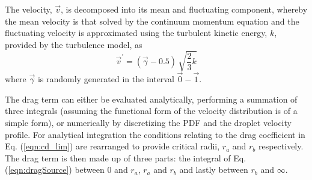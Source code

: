 \documentclass[a4paper,10pt]{article}
\begin{document}
The velocity, $\vec{v}$, is decomposed into its mean and fluctuating component, whereby the mean velocity is that solved by the continuum momentum equation and the fluctuating velocity is approximated using the turbulent kinetic energy, $k$, provided by the turbulence model, as
\begin{equation}
\vec{v}^{\prime}=(\vec{\gamma}-0.5)\,\sqrt{\frac{2}{3}k}
\end{equation}
where $\vec{\gamma}$ is randomly generated in the interval $\vec{0} - \vec{1}$.

The drag term can either be evaluated analytically, performing a summation of three integrals (assuming the functional form of the velocity distribution is of a simple form), or numerically by discretizing the PDF and the droplet velocity profile.  For analytical integration the conditions relating to the drag coefficient in Eq. (\ref{eqn:cd_lim}) are rearranged to provide critical radii, $r_{a}$ and $r_{b}$ respectively. The drag term is then made up of three parts: the integral of Eq. (\ref{eqn:dragSource}) between $0$ and $r_{a}$, $r_{a}$ and $r_{b}$ and lastly between $r_{b}$ and $\infty$.



\end{document}
